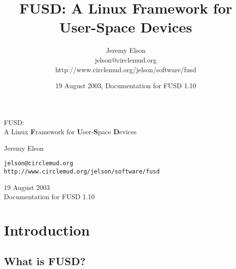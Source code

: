 \documentclass{article}
\title{FUSD:
A Linux {\bf F}ramework for {\bf U}ser-{\bf S}pace {\bf D}evices}
\author{Jeremy Elson\\
jelson@circlemud.org\\
http://www.circlemud.org/\tilde{}jelson/software/fusd}
\date{19 August 2003, Documentation for FUSD 1.10}
\begin{document}

\begin{center}
\begin{latexonly}\vspace*{2in}\end{latexonly}
{\Huge FUSD:} \\
\vspace{2\baselineskip}
{\huge A Linux {\bf F}ramework for {\bf U}ser-{\bf S}pace {\bf D}evices}

\begin{latexonly}\vspace{2in}\end{latexonly}
\vspace{\baselineskip}

\vfill

{\large Jeremy Elson \\
\begin{latexonly}\vspace{.5\baselineskip}\end{latexonly}}
\vspace{\baselineskip}
{\tt jelson@circlemud.org\\
http://www.circlemud.org/jelson/software/fusd}

\vspace{2\baselineskip}
19 August 2003\\
Documentation for FUSD 1.10\\

\end{center}
\thispagestyle{empty}
\clearpage




\begin{latexonly}

\tableofcontents
\bigskip
{}
\setlength{\parskip}{10pt}

\clearpage
\end{latexonly}

\addtolength{\parskip}{0.5\baselineskip}

\section{Introduction}

\subsection{What is FUSD?}
\end{document}
